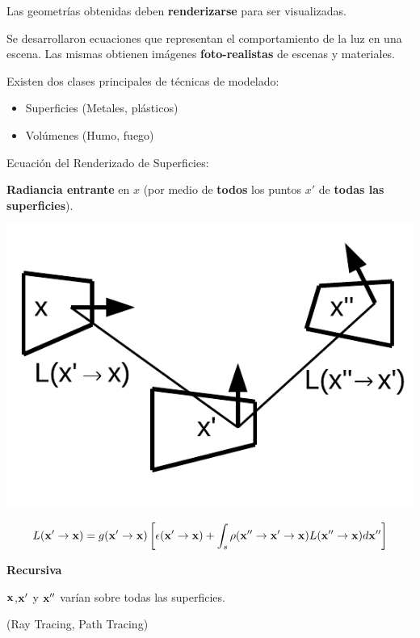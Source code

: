 \documentclass[spanish,unknownkeysallowed]{beamer}
\begin{document}
\begin{frame}
Las geometrías obtenidas deben \textbf{renderizarse} para ser visualizadas.
\vspace{0.5cm}

Se desarrollaron ecuaciones que representan el comportamiento de la luz en una escena.
Las mismas obtienen imágenes \textbf{foto-realistas} de escenas y materiales.

Existen dos clases principales de técnicas de modelado:

\begin{block}{}
\begin{itemize}
\item Superficies (Metales, plásticos)
\item Volúmenes (Humo, fuego)
\end{itemize}
\end{block}
\end{frame}


\begin{frame}{Ecuación del Renderizado de Superficies:}

\textbf{Radiancia entrante} en $x$ (por medio de \textbf{todos} los puntos $x'$ de \textbf{todas las superficies}).

\centerline{\includegraphics[scale = 0.4]{../figures/rendequation}}
\vspace{-1cm}
$$ L(\bold{x'} \rightarrow \bold{x}) =  g(\bold{x'}  \rightarrow \bold{x})  \left[ \epsilon(\bold{x'}  \rightarrow \bold{x}) + \int_{s}{\rho(\bold{x''}  \rightarrow \bold{x'}  \rightarrow \bold{x})L(\bold{x''}  \rightarrow \bold{x}) d\bold{x''}} \right] $$

\textbf{Recursiva}

$\bold{x}$,$\bold{x'}$ y $\bold{x''}$ varían sobre todas las superficies.

(Ray Tracing, Path Tracing)

\end{frame}
\end{document}
